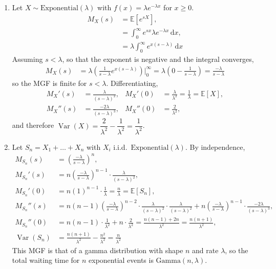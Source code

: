 \documentclass[11pt]{article}
\newcommand{\E}{\mathbb{E}}
\newcommand{\Var}{\operatorname{Var}}
\newcommand{\dd}{\,\mathrm{d}}
\begin{document}
\begin{enumerate}[label=(\alph*)]
  \item Let $X \sim \text{Exponential}(\lambda)$ with $f(x) = \lambda e^{-\lambda x}$ for $x \ge 0$.
  \begin{align}
    M_X(s) &= \E[e^{sX}], \\
    &= \int_0^\infty e^{sx}\lambda e^{-\lambda x}\dd x, \\
    &= \lambda \int_0^\infty e^{x(s-\lambda)}\dd x
  \end{align}
  Assuming $s < \lambda$, so that the exponent is negative and the integral converges,
  \begin{align}
    M_X(s) &= \lambda\left(\frac{1}{s-\lambda}e^{x(s-\lambda)}\right)\Bigg|_0^\infty
    = \lambda\left(0 - \frac{1}{s-\lambda}\right) = \frac{-\lambda}{s-\lambda}
  \end{align}
  so the MGF is finite for $s < \lambda$. Differentiating,
  \begin{align}
    M_X'(s) &= \frac{\lambda}{(s-\lambda)^2}, & M_X'(0) &= \frac{\lambda}{\lambda^2} = \frac{1}{\lambda} = \E[X], \\
    M_X''(s) &= \frac{-2\lambda}{(s-\lambda)^3}, & M_X''(0) &= \frac{2}{\lambda^2},
  \end{align}
  and therefore $\Var(X) = \dfrac{2}{\lambda^2} - \dfrac{1}{\lambda^2} = \dfrac{1}{\lambda^2}$.

  \item Let $S_n = X_1 + \dots + X_n$ with $X_i$ i.i.d.\ $\text{Exponential}(\lambda)$. By independence,
  \begin{align}
    M_{S_n}(s) &= \left(\frac{-\lambda}{s-\lambda}\right)^{n}, \\
    M_{S_n}'(s) &= n\left(\frac{-\lambda}{s-\lambda}\right)^{n-1}\cdot\frac{\lambda}{(s-\lambda)^2}, \\
    M_{S_n}'(0) &= n(1)^{n-1}\cdot\frac{1}{\lambda} = \frac{n}{\lambda} = \E[S_n], \\
    M_{S_n}''(s) &= n(n-1)\left(\frac{-\lambda}{s-\lambda}\right)^{n-2}\cdot\frac{\lambda}{(s-\lambda)^2}\cdot\frac{\lambda}{(s-\lambda)^2}
      + n\left(\frac{-\lambda}{s-\lambda}\right)^{n-1}\cdot\frac{-2\lambda}{(s-\lambda)^3}, \\
    M_{S_n}''(0) &= n(n-1)\cdot\frac{1}{\lambda^2} + n\cdot\frac{2}{\lambda^2}
      = \frac{n(n-1)+2n}{\lambda^2} = \frac{n(n+1)}{\lambda^2}, \\
    \Var(S_n) &= \frac{n(n+1)}{\lambda^2} - \frac{n^2}{\lambda^2} = \frac{n}{\lambda^2}
  \end{align}
  This MGF is that of a gamma distribution with shape $n$ and rate $\lambda$, so the total waiting
  time for $n$ exponential events is $\text{Gamma}(n, \lambda)$.
\end{enumerate}
\end{document}

